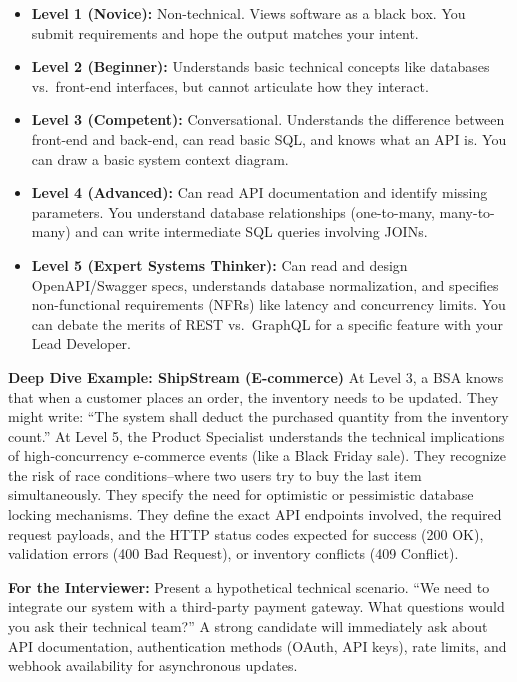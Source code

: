 \documentclass[
  11pt,
  openany,
  oneside]{book}
\providecommand{\tightlist}{%
  \setlength{\itemsep}{0pt}\setlength{\parskip}{0pt}}
\renewenvironment{quote}{\begin{customquote}}{\end{customquote}}
\begin{document}
\begin{itemize}
\tightlist
\item
  \textbf{Level 1 (Novice):} Non-technical. Views software as a black
  box. You submit requirements and hope the output matches your intent.
\item
  \textbf{Level 2 (Beginner):} Understands basic technical concepts like
  databases vs.~front-end interfaces, but cannot articulate how they
  interact.
\item
  \textbf{Level 3 (Competent):} Conversational. Understands the
  difference between front-end and back-end, can read basic SQL, and
  knows what an API is. You can draw a basic system context diagram.
\item
  \textbf{Level 4 (Advanced):} Can read API documentation and identify
  missing parameters. You understand database relationships
  (one-to-many, many-to-many) and can write intermediate SQL queries
  involving JOINs.
\item
  \textbf{Level 5 (Expert Systems Thinker):} Can read and design
  OpenAPI/Swagger specs, understands database normalization, and
  specifies non-functional requirements (NFRs) like latency and
  concurrency limits. You can debate the merits of REST vs.~GraphQL for
  a specific feature with your Lead Developer.
\end{itemize}

\textbf{Deep Dive Example: ShipStream (E-commerce)} At Level 3, a BSA
knows that when a customer places an order, the inventory needs to be
updated. They might write: ``The system shall deduct the purchased
quantity from the inventory count.'' At Level 5, the Product Specialist
understands the technical implications of high-concurrency e-commerce
events (like a Black Friday sale). They recognize the risk of race
conditions--where two users try to buy the last item simultaneously.
They specify the need for optimistic or pessimistic database locking
mechanisms. They define the exact API endpoints involved, the required
request payloads, and the HTTP status codes expected for success (200
OK), validation errors (400 Bad Request), or inventory conflicts (409
Conflict).

\begin{quote}
\textbf{For the Interviewer:} Present a hypothetical technical scenario.
``We need to integrate our system with a third-party payment gateway.
What questions would you ask their technical team?'' A strong candidate
will immediately ask about API documentation, authentication methods
(OAuth, API keys), rate limits, and webhook availability for
asynchronous updates.
\end{quote}
\end{document}
